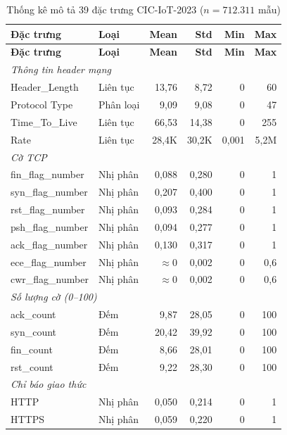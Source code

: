 \begin{footnotesize}
\begin{longtable}{|l|l|r|r|r|r|}
\caption{Thống kê mô tả 39 đặc trưng CIC-IoT-2023 ($n = 712{.}311$ mẫu)} \label{tab:cic_iot_feature_stats} \\
\hline
\textbf{Đặc trưng} & \textbf{Loại} & \textbf{Mean} & \textbf{Std} & \textbf{Min} & \textbf{Max} \\
\hline
\endfirsthead
\hline
\textbf{Đặc trưng} & \textbf{Loại} & \textbf{Mean} & \textbf{Std} & \textbf{Min} & \textbf{Max} \\
\hline
\endhead
\multicolumn{6}{|l|}{\textit{Thông tin header mạng}} \\
\hline
Header\_Length & Liên tục & 13,76 & 8,72 & 0 & 60 \\
\hline
Protocol Type & Phân loại & 9,09 & 9,08 & 0 & 47 \\
\hline
Time\_To\_Live & Liên tục & 66,53 & 14,38 & 0 & 255 \\
\hline
Rate & Liên tục & 28,4K & 30,2K & 0,001 & 5,2M \\
\hline
\multicolumn{6}{|l|}{\textit{Cờ TCP}} \\
\hline
fin\_flag\_number & Nhị phân & 0,088 & 0,280 & 0 & 1 \\
\hline
syn\_flag\_number & Nhị phân & 0,207 & 0,400 & 0 & 1 \\
\hline
rst\_flag\_number & Nhị phân & 0,093 & 0,284 & 0 & 1 \\
\hline
psh\_flag\_number & Nhị phân & 0,094 & 0,277 & 0 & 1 \\
\hline
ack\_flag\_number & Nhị phân & 0,130 & 0,317 & 0 & 1 \\
\hline
ece\_flag\_number & Nhị phân & $\approx$0 & 0,002 & 0 & 0,6 \\
\hline
cwr\_flag\_number & Nhị phân & $\approx$0 & 0,002 & 0 & 0,6 \\
\hline
\multicolumn{6}{|l|}{\textit{Số lượng cờ (0--100)}} \\
\hline
ack\_count & Đếm & 9,87 & 28,05 & 0 & 100 \\
\hline
syn\_count & Đếm & 20,42 & 39,92 & 0 & 100 \\
\hline
fin\_count & Đếm & 8,66 & 28,01 & 0 & 100 \\
\hline
rst\_count & Đếm & 9,22 & 28,30 & 0 & 100 \\
\hline
\multicolumn{6}{|l|}{\textit{Chỉ báo giao thức}} \\
\hline
HTTP & Nhị phân & 0,050 & 0,214 & 0 & 1 \\
\hline
HTTPS & Nhị phân & 0,059 & 0,220 & 0 & 1 \\

\end{longtable}
\end{footnotesize}
